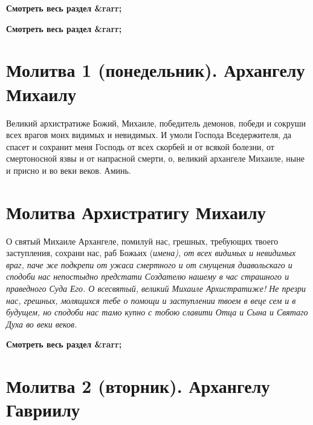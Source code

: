 




\bfseries Смотреть весь раздел &rarr;\normalfont{} 




\bfseries Смотреть весь раздел &rarr;\normalfont{} 

\section{Молитва 1 (понедельник). Архангелу Михаилу}




Великий архистратиже Божий, Михаиле, победитель демонов, победи и сокруши всех врагов моих видимых и невидимых. И умоли Господа Вседержителя, да спасет и сохранит меня Господь от всех скорбей и от всякой болезни, от смертоносной язвы и от напрасной смерти, о, великий архангеле Михаиле, ныне и присно и во веки веков. Аминь.





\section{Молитва Архистратигу Михаилу}

О святый Михаиле Архангеле, помилуй нас, грешных, требующих твоего заступления, сохрани нас, раб Божьих (\itshape имена\normalfont{}), от всех видимых и невидимых враг, паче же подкрепи от ужаса смертного и от смущения диавольскаго и сподоби нас непостыдно предстати Создателю нашему в час страшного и праведного Суда Его. О всесвятый, великий Михаиле Архистратиже! Не презри нас, грешных, молящихся тебе о помощи и заступлении твоем в веце сем и в будущем, но сподоби нас тамо купно с тобою славити Отца и Сына и Святаго Духа во веки веков.

\mychapterending




\bfseries Смотреть весь раздел &rarr;\normalfont{} 

\section{Молитва 2 (вторник).    Архангелу Гавриилу}

